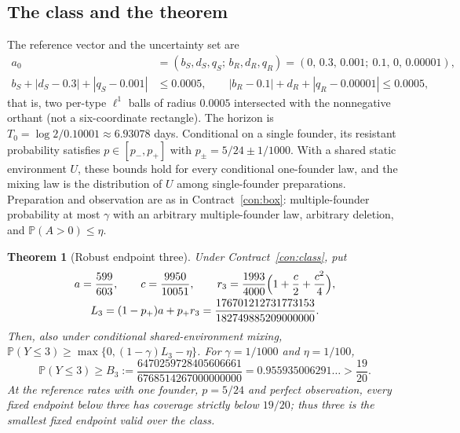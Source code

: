 \documentclass[11pt,a4paper]{article}
\theoremstyle{plain}
\newtheorem{theorem}{Theorem}[section]
\theoremstyle{definition}
\theoremstyle{remark}
\newcommand{\PP}{\mathbb P}
\begin{document}
\subsection{The class and the theorem}
The reference vector and the uncertainty set are
\begin{equation}\label{eq:class}
\begin{aligned}
a_0&=(b_S,d_S,q_S;\,b_R,d_R,q_R)=(0,\,0.3,\,0.001;\ 0.1,\,0,\,0.00001),\\
b_S+|d_S-0.3|+|q_S-0.001|&\le0.0005,\qquad |b_R-0.1|+d_R+|q_R-0.00001|\le0.0005,
\end{aligned}
\end{equation}
that is, two per-type $\ell^1$ balls of radius $0.0005$ intersected with the nonnegative orthant (not a six-coordinate rectangle). The horizon is $T_0=\log2/0.10001\approx6.93078$ days. Conditional on a single founder, its resistant probability satisfies $p\in[p_-,p_+]$ with $p_\pm=5/24\pm1/1000$. With a shared static environment $U$, these bounds hold for every conditional one-founder law, and the mixing law is the distribution of $U$ among single-founder preparations. Preparation and observation are as in Contract~\ref{con:box}: multiple-founder probability at most $\gamma$ with an arbitrary multiple-founder law, arbitrary deletion, and $\PP(A>0)\le\eta$.

\begin{theorem}[Robust endpoint three]\label{thm:three}
Under Contract~\ref{con:class}, put
\begin{equation}\label{eq:L3}
\begin{gathered}
a=\frac{599}{603},\qquad c=\frac{9950}{10051},\qquad r_3=\frac{1993}{4000}\Bigl(1+\frac c2+\frac{c^2}4\Bigr),\\
L_3=(1-p_+)a+p_+r_3=\frac{176701212731773153}{182749885209000000}.
\end{gathered}
\end{equation}
Then, also under conditional shared-environment mixing, $\PP(Y\le3)\ge\max\{0,(1-\gamma)L_3-\eta\}$. For $\gamma=1/1000$ and $\eta=1/100$,
\begin{equation}\label{eq:B3}
\PP(Y\le3)\ge B_3:=\frac{6470259728405606661}{6768514267000000000}=0.955935006291\ldots>\frac{19}{20}.
\end{equation}
At the reference rates with one founder, $p=5/24$ and perfect observation, every fixed endpoint below three has coverage strictly below $19/20$; thus three is the smallest fixed endpoint valid over the class.
\end{theorem}
\end{document}
